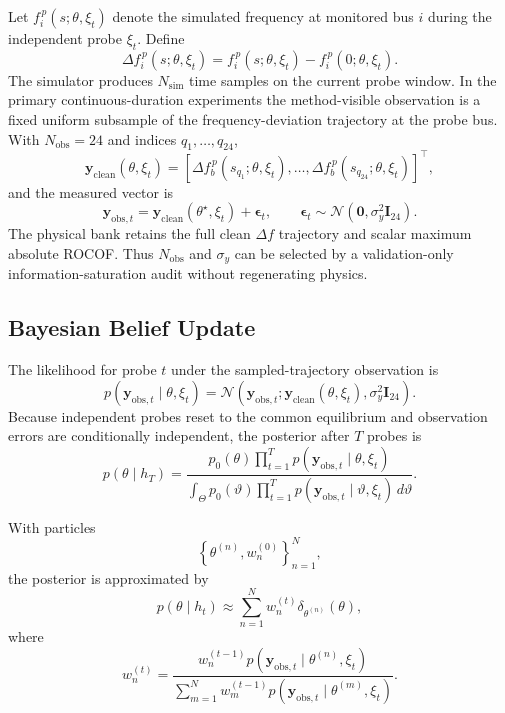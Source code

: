 \documentclass[11pt]{article}
\begin{document}
Let \(f_i^{\,p}(s;\theta,\xi_t)\) denote the simulated frequency at monitored
bus \(i\) during the independent probe \(\xi_t\). Define
\[
\Delta f_i^{\,p}(s;\theta,\xi_t)
=
f_i^{\,p}(s;\theta,\xi_t)-f_i^{\,p}(0;\theta,\xi_t).
\]
The simulator produces \(N_{\mathrm{sim}}\) time samples on the current probe
window. In the primary continuous-duration experiments the method-visible
observation is a fixed uniform subsample of the frequency-deviation trajectory
at the probe bus. With \(N_{\mathrm{obs}}=24\) and indices
\(q_1,\ldots,q_{24}\),
\[
\boxed{
\mathbf y_{\mathrm{clean}}(\theta,\xi_t)
=
\left[
\Delta f_b^{\,p}(s_{q_1};\theta,\xi_t),\ldots,
\Delta f_b^{\,p}(s_{q_{24}};\theta,\xi_t)
\right]^{\!\top},
}
\label{eq:y_clean}
\]
and the measured vector is
\[
\boxed{
\mathbf y_{\mathrm{obs},t}
=
\mathbf y_{\mathrm{clean}}(\theta^\star,\xi_t)
+
\boldsymbol\epsilon_t,
\qquad
\boldsymbol\epsilon_t
\sim
\mathcal N\!\left(\mathbf 0,\sigma_y^2\mathbf I_{24}\right).
}
\label{eq:y_obs}
\]
The physical bank retains the full clean \(\Delta f\) trajectory and scalar
maximum absolute ROCOF. Thus \(N_{\mathrm{obs}}\) and \(\sigma_y\) can be selected
by a validation-only information-saturation audit without regenerating physics.

\subsection{Bayesian Belief Update}

The likelihood for probe \(t\) under the sampled-trajectory observation is
\[
p(\mathbf y_{\mathrm{obs},t}\mid\theta,\xi_t)
=
\mathcal N
\left(
\mathbf y_{\mathrm{obs},t};
\mathbf y_{\mathrm{clean}}(\theta,\xi_t),
\sigma_y^2\mathbf I_{24}
\right).
\]
Because independent probes reset to the common equilibrium and observation
errors are conditionally independent, the posterior after \(T\) probes is
\[
\boxed{
p(\theta\mid h_T)
=
\frac{
p_0(\theta)
\displaystyle\prod_{t=1}^{T}
p(\mathbf y_{\mathrm{obs},t}\mid\theta,\xi_t)
}{
\displaystyle
\int_{\Theta}
p_0(\vartheta)
\prod_{t=1}^{T}
p(\mathbf y_{\mathrm{obs},t}\mid\vartheta,\xi_t)
\,d\vartheta
}.
}
\label{eq:posterior}
\]

With particles
\[
\left\{
\theta^{(n)},w_n^{(0)}
\right\}_{n=1}^{N},
\]
the posterior is approximated by
\[
p(\theta\mid h_t)
\approx
\sum_{n=1}^{N}
w_n^{(t)}
\delta_{\theta^{(n)}}(\theta),
\]
where
\[
\boxed{
w_n^{(t)}
=
\frac{
w_n^{(t-1)}
p(\mathbf y_{\mathrm{obs},t}\mid\theta^{(n)},\xi_t)
}{
\displaystyle
\sum_{m=1}^{N}
w_m^{(t-1)}
p(\mathbf y_{\mathrm{obs},t}\mid\theta^{(m)},\xi_t)
}.
}
\label{eq:weight_update}
\]
\end{document}
